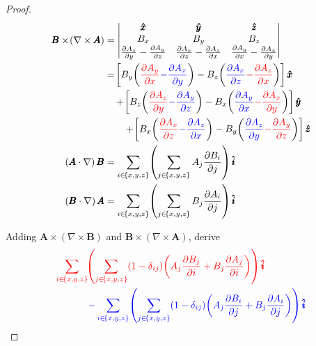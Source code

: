 \documentclass[a4paper]{article}
\begin{document}
\begin{proof}[Proof]
\begin{align*}
	\pmb{B} \times \!\left( \nabla \times \pmb{A} \right) & = \begin{vmatrix}
		\pmb{\hat{x}} & \pmb{\hat{y}} & \pmb{\hat{z}} \\
		B_{x} & B_{y} & B_{z} \\
		\frac{\partial A_{z}}{\partial y} - \frac{\partial A_{y}}{\partial z} & \frac{\partial A_{x}}{\partial z} - \frac{\partial A_{z}}{\partial x} & \frac{\partial A_{y}}{\partial x} - \frac{\partial A_{x}}{\partial y}
	\end{vmatrix} \\
							      & = \!\left[ B_{y}\!\left( \textcolor{red}{\frac{\partial A_{y}}{\partial x}} \textcolor{blue}{- \frac{\partial A_{x}}{\partial y}} \right) - B_{z}\!\left( \textcolor{blue}{\frac{\partial A_{x}}{\partial z}} \textcolor{red}{- \frac{\partial A_{z}}{\partial x}} \right) \right]\pmb{\hat{x}} \\
							      & \quad + \!\left[ B_{z}\!\left( \textcolor{red}{\frac{\partial A_{z}}{\partial y}} \textcolor{blue}{- \frac{\partial A_{y}}{\partial z}} \right) - B_{x}\!\left( \textcolor{blue}{\frac{\partial A_{y}}{\partial x}} \textcolor{red}{- \frac{\partial A_{x}}{\partial y}} \right) \right]\pmb{\hat{y}} \\
							      & \qquad + \!\left[ B_{x}\!\left( \textcolor{red}{\frac{\partial A_{x}}{\partial z}} \textcolor{blue}{- \frac{\partial A_{z}}{\partial x}} \right) - B_{y}\!\left( \textcolor{blue}{\frac{\partial A_{z}}{\partial y}} \textcolor{red}{- \frac{\partial A_{y}}{\partial z}} \right) \right]\pmb{\hat{z}} \\
	\!\left( \pmb{A} \cdot \nabla \right)\pmb{B} & = \sum_{i \in \!\left\{ x,y,z \right\}} \!\left( \sum_{j \in \!\left\{ x,y,z \right\}} A_{j}\frac{\partial B_{i}}{\partial j} \right)\pmb{\hat{i}} \\
	\!\left( \pmb{B} \cdot \nabla \right)\pmb{A} & = \sum_{i \in \!\left\{ x,y,z \right\}} \!\left( \sum_{j \in \!\left\{ x,y,z \right\}} B_{j}\frac{\partial A_{i}}{\partial j} \right)\pmb{\hat{i}}
\end{align*}

Adding \( \pmb{A} \times \!\left( \nabla \times \pmb{B} \right) \) and \( \pmb{B} \times \!\left( \nabla \times \pmb{A} \right) \), derive
\begin{align*}
	\textcolor{red}{\sum_{i \in \!\left\{ x,y,z \right\}}} & \textcolor{red}{\!\left( \sum_{j \in \!\left\{ x,y,z \right\}} \!\left( 1 - \delta_{ij} \right)\!\left( A_{j}\frac{\partial B_{j}}{\partial i} + B_{j}\frac{\partial A_{j}}{\partial i} \right) \right)\pmb{\hat{i}}} \\
							       & \textcolor{blue}{-\sum_{i \in \!\left\{ x,y,z \right\}} \!\left( \sum_{j \in \!\left\{ x,y,z \right\}} \!\left( 1 - \delta_{ij} \right)\!\left( A_{j}\frac{\partial B_{i}}{\partial j} + B_{j}\frac{\partial A_{i}}{\partial j} \right) \right) \pmb{\hat{i}}}
\end{align*}


\end{proof}
\end{document}
